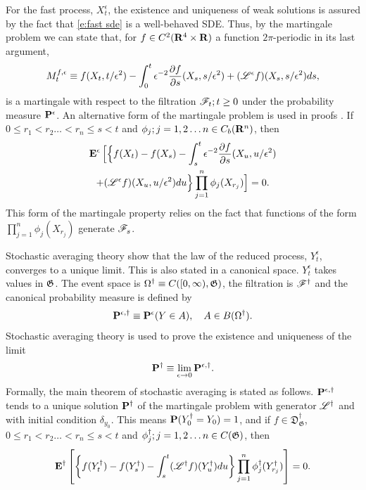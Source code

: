 For the fast process, $X_t^\epsilon$, the existence and uniqueness of weak solutions is assured by the fact that \eqref{e:fast sde} is a well-behaved SDE. Thus, by the martingale problem we can state that, for $f \in C^2(\mathbf R^4 \times \mathbf R)$ a function $2\pi$-periodic in its last argument,
\[
M_t^{f,\epsilon} \equiv f(X_t,t/\epsilon^2) - \int_0^t \epsilon^{-2} \frac{\partial f}{\partial s}(X_s,s/\epsilon^2) + (\mathscr L^\epsilon f)(X_s,s/\epsilon^2) ds,
\]
is a martingale with respect to the filtration ${\mathscr F_t; t \geq 0}$ under the probability measure $\mathbf P^\epsilon$. An alternative form of the martingale problem is used in proofs \citep{ethier86:_markov_process}. If $0 \leq r_1 < r_2 \dots < r_n \leq s < t$ and ${\phi_j; j = 1,2 \dots n} \in C_b(\mathbf R^n)$, then
\begin{multline*}
\operatorname{\mathbf E}^\epsilon \Big[\Big\{f(X_t) - f(X_s) - \int_s^t \epsilon^{-2} \frac{\partial f}{\partial s}(X_u,u/\epsilon^2) \\
+ (\mathscr L^\epsilon f)(X_u,u/\epsilon^2) du\Big\} \prod_{j=1}^{n} \phi_j(X_{r_j})\Big] = 0.
\end{multline*}
This form of the martingale property relies on the fact that functions of the form $\prod_{j=1}^n \phi_j(X_{r_j})$ generate $\mathscr F_s$.

Stochastic averaging theory show that the law of the reduced process, $Y^\epsilon_t$, converges to a unique limit. This is also stated in a canonical space. $Y^\epsilon_t$ takes values in $\mathfrak G$. The event space is $\Omega^\dagger \equiv C([0,\infty),\mathfrak G)$, the filtration is $\mathscr F^\dagger$ and the canonical probability measure is defined by
\[
\mathbf P^{\epsilon,\dagger} \equiv \mathbf P^{\epsilon}(Y \in A),\quad A \in B(\Omega^\dagger).
\]
Stochastic averaging theory is used to prove the existence and uniqueness of the limit
\begin{equation}
\label{e:limit def}
\mathbf P^\dagger \equiv \lim_{\epsilon \to 0} \mathbf P^{\epsilon,\dagger}.
\end{equation}
Formally, the main theorem of stochastic averaging is stated as follows. $\mathbf P^{\epsilon,\dagger}$ tends to a unique solution $\mathbf P^\dagger$ of the martingale problem with generator $\mathscr L^\dagger$ and with initial condition $\delta_{y_0}$. This means $\mathbf P(Y_0^\dagger = Y_0) = 1$, and if $f \in \mathfrak{D}_\mathfrak{G}^\dagger$, $0 \leq r_1 < r_2 \dots < r_n \leq s < t$ and ${\phi_j^\dagger; j = 1,2 \dots n} \in C(\mathfrak G)$, then
\begin{equation}
\label{e:sa main}
\operatorname{\mathbf E}^\dagger \left[\left\{f(Y_t^\dagger) - f(Y_s^\dagger) - \int_s^t (\mathscr L^\dagger f)(Y_u^\dagger) du\right\} \prod_{j=1}^{n} \phi_j^\dagger(Y_{r_j}^\dagger)\right] = 0.
\end{equation}

